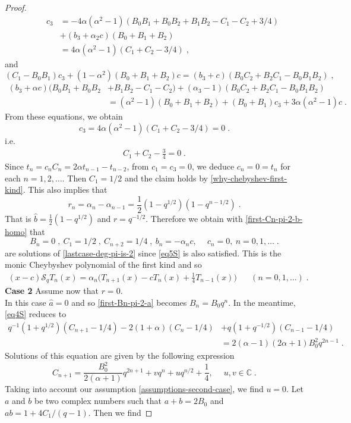\documentclass{amsart}
\theoremstyle{remark}
\numberwithin{equation}{section}
\begin{document}
\begin{proof}
\begin{align*}
\quad\quad c_3&=- 4\alpha(\alpha^2-1)(B_0B_1+B_0B_2+B_1B_2-C_1-C_2+3/4)\\
&+(b_3+\alpha_2c)(B_0+B_1+B_2)\\
&=  4\alpha(\alpha^2-1)(C_1+C_2-3/4)\;,
\end{align*}
and
$$(C_1-B_0B_1)c_3+(1-\alpha^2)(B_0+B_1+B_2)c=(b_3+c)(B_0C_2+B_2C_1-B_0B_1B_2)\;,$$
\begin{align*}
(b_3+\alpha c)(B_0B_1+B_0B_2&+B_1B_2-C_1-C_2)+(\alpha_3-1)(B_0C_2+B_2C_1-B_0B_1B_2)\\
&=(\alpha^2-1)(B_0+B_1+B_2)+(B_0+B_1)c_3+3\alpha(\alpha^2-1)c\;.
\end{align*}
From these equations, we obtain
$$c_3=4\alpha(\alpha^2-1)(C_1+C_2-3/4)=0\;.$$ i.e.
\begin{align}\label{why-chebyshev-first-kind}
C_1+C_2-\frac{3}{4}=0\;.
\end{align}
Since $t_n=c_nC_n=2\alpha t_{n-1}-t_{n-2}$, from $c_1=c_3=0$, we deduce $c_n=0=t_n$ for each $n=1,2,\ldots$. Then $C_1=1/2$ and the claim holds by \eqref{why-chebyshev-first-kind}. This also implies that $$r_n=\alpha_n-\alpha_{n-1}=\frac{1}{2}(1-q^{1/2})(1-q^{n-1/2})\;.$$
That is $\widehat{b}=\frac{1}{2}(1-q^{1/2})$ and $r=q^{-1/2}$. 
Therefore we obtain with \eqref{first-Cn-pi-2-b-homo} that
$$B_{n}=0\;,~C_1=1/2\;,~C_{n+2}=1/4\;,~b_n=-\alpha_nc,\quad~c_n=0,~ n=0,1,\ldots\;.$$
are solutions of \eqref{lastcase-deg-pi-is-2} since \eqref{eq5S} is also satisfied. This is the monic Cheybyshev polynomial of the first kind and so
\begin{align}\label{relation-case2-chebyshev}
(x-c)\mathcal{S}_qT_n(x)=\alpha_n\big(T_{n+1}(x)-c T_n(x)+\mbox{$\frac{1}{4}$}T_{n-1}(x)  \big)~~\quad~ (n=0,1,\ldots)\;.
\end{align}
\textbf{Case 2} Assume now that $r=0$.\\
In this case $\widehat{a}=0$ and so \eqref{first-Bn-pi-2-a} becomes $B_n=B_0q^n$. In the meantime, \eqref{eq4S} reduces to
\begin{align*}
q^{-1}(1+q^{1/2})(C_{n+1}-1/4)-2(1+\alpha)(C_n-1/4)&+q(1+q^{-1/2})(C_{n-1}-1/4)\\
&=2(\alpha-1)(2\alpha+1)B_0 ^2q^{2n-1} \;.
\end{align*}
Solutions of this equation are given by the following expression $$C_{n+1}=\frac{B_0 ^2}{2(\alpha+1)}q^{2n+1}+vq^n+uq^{n/2}+\frac{1}{4},\;\quad u,v\in \mathbb{C}\;.$$ Taking into account our assumption \eqref{assumptions-second-case}, we find $u=0$. Let $a$ and $b$ be two complex numbers such that $a+b=2B_0$ and $ab=1+4C_1/(q-1)$. Then we find

\end{proof}
\end{document}

